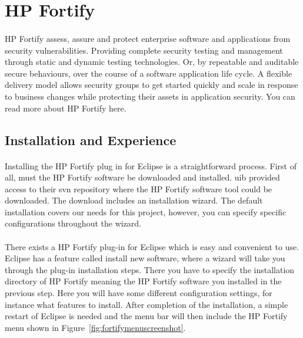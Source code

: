 \documentclass[11pt,english,a4paper]{report}
\begin{document}
\newpage

\section{HP Fortify}
\paragraph{}
HP Fortify assess, assure and protect enterprise software and applications from security vulnerabilities.
Providing complete security testing and management through static and dynamic testing technologies. 
Or, by repeatable and auditable secure behaviours, over the course of a software application life cycle. 
A flexible delivery model allows security groups to get started quickly and scale in response to business changes while protecting their assets in application security. 
You can read more about HP Fortify here. \cite{fortify-software-wiki, fortify-software-homepage-features} 

\subsection{Installation and Experience}
\paragraph{}
Installing the HP Fortify plug in for Eclipse is a straightforward process. 
First of all, must the HP Fortify software be downloaded and installed.
\gls{uib} provided access to their \gls{svn} repository where the HP Fortify software tool could be downloaded.  
The download includes an installation wizard. 
The default installation covers our needs for this project, however, you can specify specific configurations throughout the wizard. \cite{installation-usage-guide}

\paragraph{}
There exists a HP Fortify plug-in for Eclipse which is easy and convenient to use.
Eclipse has a feature called install new software, where a wizard will take you through the plug-in installation steps.
There you have to specify the installation directory of HP Fortify meaning the HP Fortify software you installed in the previous step.
Here you will have some different configuration settings, for instance what features to install.
After completion of the installation, a simple restart of Eclipse is needed and the menu bar will then include the HP Fortify menu shown in Figure~\ref{fig:fortifymenuscreenshot}. \cite{installation-usage-guide}
\end{document}
